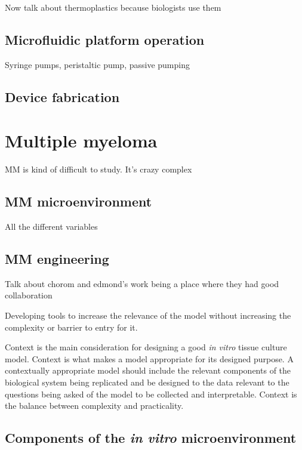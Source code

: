 Now talk about thermoplastics because biologists use them


\subsection{Microfluidic platform operation}
Syringe pumps, peristaltic pump, passive pumping

\subsection{Device fabrication}


\section{Multiple myeloma}
MM is kind of difficult to study. It's crazy complex


\subsection{MM microenvironment}
All the different variables


\subsection{MM engineering}

Talk about chorom and edmond's work being a place where they had good collaboration 

Developing tools to increase the relevance of the model without increasing the complexity or barrier to entry for it. 







Context is the main consideration for designing a good \textit{in vitro} tissue culture model. Context is what makes a model appropriate for its designed purpose. A contextually appropriate model should include the relevant components of the biological system being replicated and be designed to the data relevant to the questions being asked of the model to be collected and interpretable. Context is the balance between complexity and practicality.

\subsection{Components of the \textit{in vitro} microenvironment}
